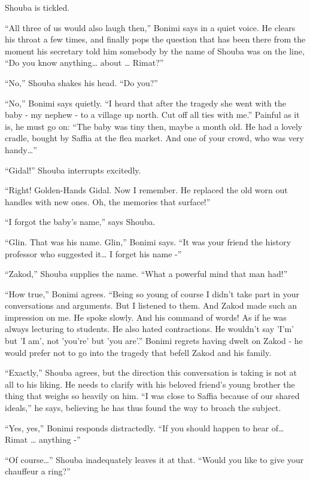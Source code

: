 \documentclass[twoside,11pt]{book}
\begin{document}
Shouba is tickled.

``All three of us would also laugh then,'' Bonimi says in a quiet voice. He clears his throat
a few times, and finally pops the question that has been there from the moment his secretary told him somebody by the
name of Shouba was on the line, ``Do you know anything{\dots} about {\dots} Rimat?''

``No,'' Shouba shakes his head. ``Do you?''

``No,'' Bonimi says quietly. ``I heard that after the tragedy she went with the
baby - my nephew - to a village up north. Cut off all ties with me.'' Painful as it is, he must go on: ``The baby was
tiny then, maybe a month old. He had a lovely cradle, bought by Saffia at the flea market. And one of your crowd, who
was very handy{\dots}''

``Gidal!'' Shouba interrupts excitedly.

``Right! Golden-Hands Gidal. Now I remember. He replaced the old worn out handles with new ones. Oh, the
memories that surface!''

``I forgot the baby's name,'' says Shouba.

``Glin. That was his name. Glin,'' Bonimi says. ``It was your friend the history
professor who suggested it{\dots} I forget his name -''

``Zakod,'' Shouba supplies the name. ``What a powerful mind that man
had!''

``How true,'' Bonimi agrees. ``Being so young of course I didn't take part in
your conversations and arguments. But I listened to them. And Zakod made such an impression on me. He spoke slowly. And
his command of words! As if he was always lecturing to students. He also hated contractions. He wouldn't say 'I'm' but
'I am', not 'you're' but 'you are'.'' Bonimi regrets having dwelt on Zakod - he would prefer not to go
into the tragedy that befell Zakod and his family.

``Exactly,'' Shouba agrees, but the direction this conversation is taking is not at all to his
liking. He needs to clarify with his beloved friend's young brother the thing that weighs so heavily on him.
``I was close to Saffia because of our shared ideals,'' he says, believing he has thus found
the way to broach the subject.

``Yes, yes,'' Bonimi responds distractedly. ``If you should happen to hear
of{\dots} Rimat {\dots} anything -''

``Of course{{\dots}}'' Shouba inadequately leaves it
at that. ``Would you like to give your chauffeur a ring?''
\end{document}
